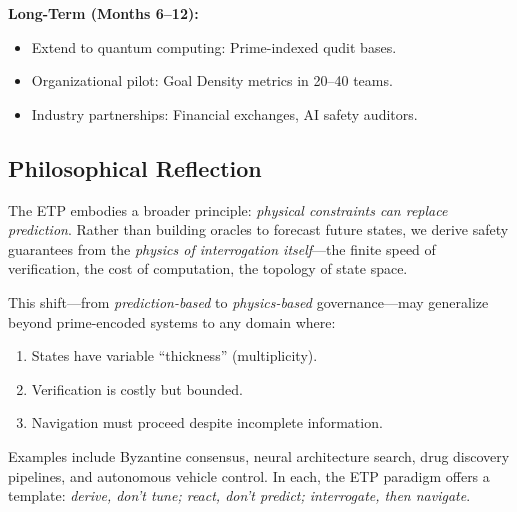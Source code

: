 \documentclass[12pt,a4paper]{article}
\begin{document}
\textbf{Long-Term (Months 6--12):}
\begin{itemize}
\item Extend to quantum computing: Prime-indexed qudit bases.
\item Organizational pilot: Goal Density metrics in 20--40 teams.
\item Industry partnerships: Financial exchanges, AI safety auditors.
\end{itemize}

\subsection{Philosophical Reflection}

The ETP embodies a broader principle: \textit{physical constraints can replace prediction}. Rather than building oracles to forecast future states, we derive safety guarantees from the \textit{physics of interrogation itself}—the finite speed of verification, the cost of computation, the topology of state space.

This shift—from \textit{prediction-based} to \textit{physics-based} governance—may generalize beyond prime-encoded systems to any domain where:
\begin{enumerate}
\item States have variable ``thickness'' (multiplicity).
\item Verification is costly but bounded.
\item Navigation must proceed despite incomplete information.
\end{enumerate}

Examples include Byzantine consensus, neural architecture search, drug discovery pipelines, and autonomous vehicle control. In each, the ETP paradigm offers a template: \textit{derive, don't tune; react, don't predict; interrogate, then navigate}.
\end{document}
